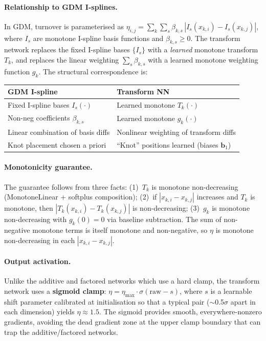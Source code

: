 \documentclass{article}
\begin{document}
\paragraph{Relationship to GDM I-splines.}
In GDM, turnover is parameterised as $\eta_{i,j} = \sum_k \sum_s \beta_{k,s}\,|I_s(x_{k,i}) - I_s(x_{k,j})|$, where $I_s$ are monotone I-spline basis functions and $\beta_{k,s} \geq 0$. The transform network replaces the fixed I-spline bases $\{I_s\}$ with a \emph{learned} monotone transform $T_k$, and replaces the linear weighting $\sum_s \beta_{k,s}$ with a learned monotone weighting function $g_k$. The structural correspondence is:

\begin{center}
\begin{tabular}{l|l}
    GDM I-spline & Transform NN \\
    \hline
    Fixed I-spline bases $I_s(\cdot)$ & Learned monotone $T_k(\cdot)$ \\
    Non-neg coefficients $\beta_{k,s}$ & Learned monotone $g_k(\cdot)$ \\
    Linear combination of basis diffs & Nonlinear weighting of transform diffs \\
    Knot placement chosen a priori & ``Knot'' positions learned (biases $\mathbf{b}_1$) \\
\end{tabular}
\end{center}

\paragraph{Monotonicity guarantee.}
The guarantee follows from three facts: (1)~$T_k$ is monotone non-decreasing (MonotoneLinear + softplus composition); (2)~if $|x_{k,i} - x_{k,j}|$ increases and $T_k$ is monotone, then $|T_k(x_{k,i}) - T_k(x_{k,j})|$ is non-decreasing; (3)~$g_k$ is monotone non-decreasing with $g_k(0) = 0$ via baseline subtraction. The sum of non-negative monotone terms is itself monotone and non-negative, so $\eta$ is monotone non-decreasing in each $|x_{k,i} - x_{k,j}|$.

\paragraph{Output activation.}
Unlike the additive and factored networks which use a hard clamp, the transform network uses a \textbf{sigmoid clamp}: $\eta = \eta_{\max} \cdot \sigma(\text{raw} - s)$, where $s$ is a learnable shift parameter calibrated at initialisation so that a typical pair ($\sim$0.5$\sigma$ apart in each dimension) yields $\eta \approx 1.5$. The sigmoid provides smooth, everywhere-nonzero gradients, avoiding the dead gradient zone at the upper clamp boundary that can trap the additive/factored networks.
\end{document}
